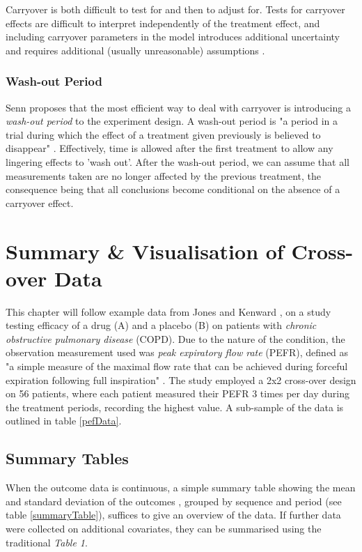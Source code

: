 \documentclass[12pt, TexShade, letterpaper]{report}
\begin{document}
Carryover is both difficult to test for and then to adjust for. Tests for carryover effects are difficult to interpret independently of the treatment effect, and including carryover parameters in the model introduces additional uncertainty and requires additional (usually unreasonable) assumptions \cite{senn2002crossover}.

\subsection{Wash-out Period}
Senn \cite{senn2002crossover} proposes that the most efficient way to deal with carryover is introducing a \textit{wash-out period} to the experiment design. A wash-out period is "a period in a trial during which the effect of a treatment given previously is believed to disappear" \cite{senn2002crossover}. Effectively, time is allowed after the first treatment to allow any lingering effects to 'wash out'. After the wash-out period, we can assume that all measurements taken are no longer affected by the previous treatment, the consequence being that all conclusions become conditional on the absence of a carryover effect.

\chapter{Summary \& Visualisation of Cross-over Data} \label{visualisation}
This chapter will follow example data from Jones and Kenward \cite{jones2003design}, on a study testing efficacy of a drug (A) and a placebo (B) on patients with \textit{chronic obstructive pulmonary disease} (COPD). Due to the nature of the condition, the observation measurement used was \textit{peak expiratory flow rate} (PEFR), defined as "a simple measure of the maximal flow rate that can be achieved during forceful expiration following full inspiration" \cite{peakflowrate2023}. The study employed a 2x2 cross-over design on 56 patients, where each patient measured their PEFR 3 times per day during the treatment periods, recording the highest value. A sub-sample of the data is outlined in table \ref{pefData}.


\section{Summary Tables}
When the outcome data is continuous, a simple summary table showing the mean and standard deviation of the outcomes \cite{vetter2017descriptive}, grouped by sequence and period (see table \ref{summaryTable}), suffices to give an overview of the data.  If further data were collected on additional covariates, they can be summarised using the traditional \textit{Table 1}.

\end{document}

